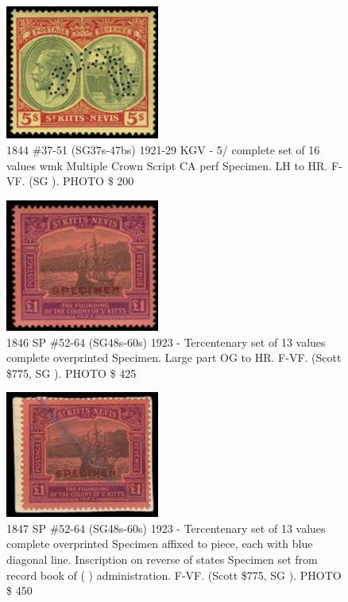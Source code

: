 \begin{figure}[htbp]
\centering
\includegraphics[width=0.45\textwidth]{../st-kitts-nevis/1844.jpg}
\caption{
1844
\#37-51 (SG37s-47bs) 1921-29 KGV \halfd - 5/ complete set of 16 values 
wmk Multiple Crown Script CA perf Specimen. LH to HR. F-VF. (SG ). PHOTO
\$      200
} 
\end{figure}  

\begin{figure}[htbp]
\centering
\includegraphics[width=0.45\textwidth]{../st-kitts-nevis/1846.jpg}
\caption{
1846
SP
\#52-64 (SG48s-60s) 1923 \halfd -  Tercentenary set of 13 values complete
overprinted Specimen. Large part OG to HR. F-VF. (Scott \$775, SG ). PHOTO
\$      425
} 
\end{figure}



\begin{figure}[htbp]
\centering
\includegraphics[width=0.45\textwidth]{../st-kitts-nevis/1847.jpg}
\caption{
1847
SP
\#52-64 (SG48s-60s) 1923 \halfd -  Tercentenary set of 13 values 
complete overprinted Specimen affixed to piece, each with blue diagonal 
line. Inscription on reverse of  states Specimen set from record 
book of ( ) administration. F-VF. (Scott \$775, SG ). PHOTO
\$      450
} 
\end{figure}

